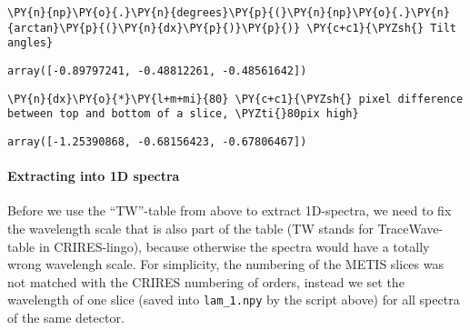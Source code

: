     \begin{tcolorbox}[breakable, size=fbox, boxrule=1pt, pad at break*=1mm,colback=cellbackground, colframe=cellborder]
\begin{Verbatim}[commandchars=\\\{\}]
\PY{n}{np}\PY{o}{.}\PY{n}{degrees}\PY{p}{(}\PY{n}{np}\PY{o}{.}\PY{n}{arctan}\PY{p}{(}\PY{n}{dx}\PY{p}{)}\PY{p}{)} \PY{c+c1}{\PYZsh{} Tilt angles}
\end{Verbatim}
\end{tcolorbox}

            \begin{tcolorbox}[breakable, size=fbox, boxrule=.5pt, pad at break*=1mm, opacityfill=0]
\begin{Verbatim}[commandchars=\\\{\}]
array([-0.89797241, -0.48812261, -0.48561642])
\end{Verbatim}
\end{tcolorbox}
        
    \begin{tcolorbox}[breakable, size=fbox, boxrule=1pt, pad at break*=1mm,colback=cellbackground, colframe=cellborder]
\begin{Verbatim}[commandchars=\\\{\}]
\PY{n}{dx}\PY{o}{*}\PY{l+m+mi}{80} \PY{c+c1}{\PYZsh{} pixel difference between top and bottom of a slice, \PYZti{}80pix high}
\end{Verbatim}
\end{tcolorbox}

            \begin{tcolorbox}[breakable, size=fbox, boxrule=.5pt, pad at break*=1mm, opacityfill=0]
\begin{Verbatim}[commandchars=\\\{\}]
array([-1.25390868, -0.68156423, -0.67806467])
\end{Verbatim}
\end{tcolorbox}

\paragraph{Extracting into 1D spectra}
Before we use the ``TW''-table from above to extract 1D-spectra, we need
to fix the wavelength scale that is also part of the table (TW stands
for TraceWave-table in CRIRES-lingo), because otherwise the spectra
would have a totally wrong wavelengh scale. For simplicity, the
numbering of the METIS slices was not matched with the CRIRES numbering
of orders, instead we set the wavelength of one slice (saved into
\texttt{lam\_1.npy} by the script above) for all spectra of the same
detector.

